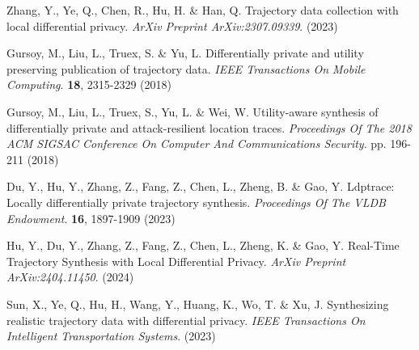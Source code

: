 \begin{thebibliography}{10}
\begin{small}
Zhang, Y., Ye, Q., Chen, R., Hu, H. \& Han, Q. Trajectory data collection with local differential privacy. {\em ArXiv Preprint ArXiv:2307.09339}. (2023)

Gursoy, M., Liu, L., Truex, S. \& Yu, L. Differentially private and utility preserving publication of trajectory data. {\em IEEE Transactions On Mobile Computing}. \textbf{18}, 2315-2329 (2018)

Gursoy, M., Liu, L., Truex, S., Yu, L. \& Wei, W. Utility-aware synthesis of differentially private and attack-resilient location traces. {\em Proceedings Of The 2018 ACM SIGSAC Conference On Computer And Communications Security}. pp. 196-211 (2018)

Du, Y., Hu, Y., Zhang, Z., Fang, Z., Chen, L., Zheng, B. \& Gao, Y. Ldptrace: Locally differentially private trajectory synthesis. {\em Proceedings Of The VLDB Endowment}. \textbf{16}, 1897-1909 (2023)

Hu, Y., Du, Y., Zhang, Z., Fang, Z., Chen, L., Zheng, K. \& Gao, Y. Real-Time Trajectory Synthesis with Local Differential Privacy. {\em ArXiv Preprint ArXiv:2404.11450}. (2024)

Sun, X., Ye, Q., Hu, H., Wang, Y., Huang, K., Wo, T. \& Xu, J. Synthesizing realistic trajectory data with differential privacy. {\em IEEE Transactions On Intelligent Transportation Systems}. (2023)





\end{small}
\end{thebibliography}